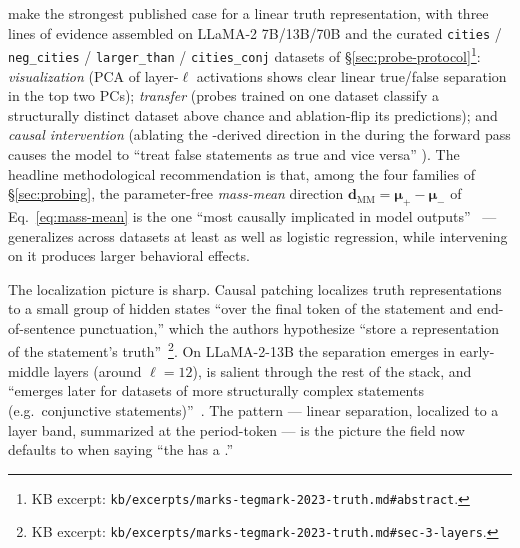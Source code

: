 \citet{marks-tegmark-2023-truth} make the strongest published case for
a linear truth representation, with three lines of evidence assembled
on LLaMA-2 7B/13B/70B and the curated \texttt{cities} /
\texttt{neg\_cities} / \texttt{larger\_than} / \texttt{cities\_conj}
datasets of \S\ref{sec:probe-protocol}\footnote{KB excerpt:
\nolinkurl{kb/excerpts/marks-tegmark-2023-truth.md#abstract}.}:
\emph{visualization} (PCA of layer-$\ell$ activations shows clear
linear true/false separation in the top two PCs); \emph{transfer}
(probes trained on one dataset classify a structurally distinct
dataset above chance and ablation-flip its predictions); and
\emph{causal intervention} (ablating the -derived direction in
the  during the forward pass causes the model to
``treat false statements as true and vice versa''
\citep[abstract]{marks-tegmark-2023-truth}). The headline
methodological recommendation is that, among the four  families
of \S\ref{sec:probing}, the parameter-free \emph{mass-mean} direction
$\mathbf{d}_\mathrm{MM} = \boldsymbol{\mu}_+ - \boldsymbol{\mu}_-$ of
Eq.~\eqref{eq:mass-mean} is the one ``most causally implicated in
model outputs''~\citep[\S 1]{marks-tegmark-2023-truth} --- generalizes
across datasets at least as well as logistic regression, while
intervening on it produces larger behavioral effects.

The localization picture is sharp. Causal patching localizes truth
representations to a small group of hidden states ``over the final
token of the statement and end-of-sentence punctuation,'' which the
authors hypothesize ``store a representation of the statement's
truth''~\citep[\S 3]{marks-tegmark-2023-truth}\footnote{KB excerpt:
\nolinkurl{kb/excerpts/marks-tegmark-2023-truth.md#sec-3-layers}.}. On
LLaMA-2-13B the separation emerges in early-middle layers (around
$\ell = 12$), is salient through the rest of the stack, and ``emerges
later for datasets of more structurally complex statements (e.g.\
conjunctive statements)''~\citep[\S 4]{marks-tegmark-2023-truth}. The
pattern --- linear separation, localized to a layer band, summarized
at the period-token --- is the picture the field now defaults to when
saying ``the \glsterm{llm}{LLM} has a .''

